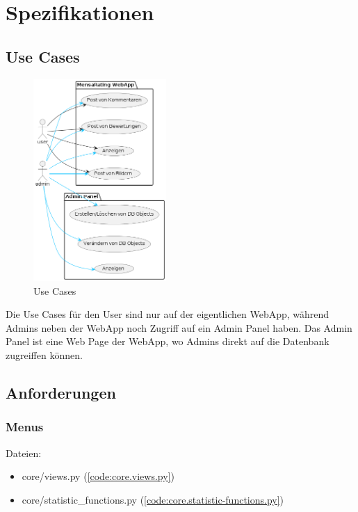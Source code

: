 \chapter{Spezifikationen}

\section{Use Cases} \label{sec:UseCases}
\begin{figure}[ht!]
    \centering
    \includegraphics[width=0.45\textwidth]{images/Use Case.png}
    \caption{Use Cases}
    \label{fig:UseCases}
\end{figure}

Die Use Cases für den User sind nur auf der eigentlichen WebApp, während Admins
neben der WebApp noch Zugriff auf ein Admin Panel haben. Das Admin Panel ist
eine Web Page der WebApp, wo Admins direkt auf die Datenbank zugreiffen können.



\newpage

\section{Anforderungen} \label{sec:Anforderungen}
\subsection{Menus} \label{spez:Menus}

Dateien:
\begin{itemize}
    \item core/views.py (\ref{code:core.views.py})
    \item core/statistic\_functions.py (\ref{code:core.statistic-functions.py})
\end{itemize}

